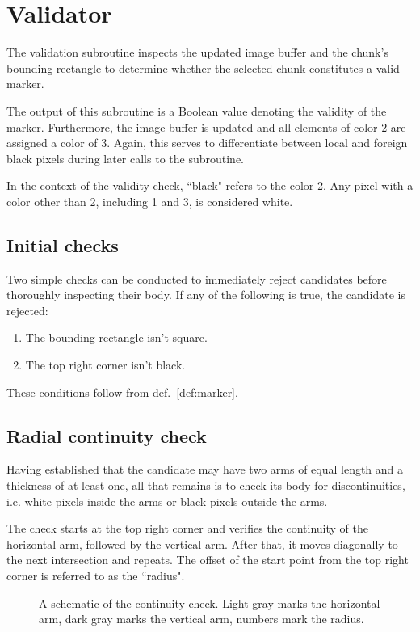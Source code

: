 \documentclass{article}
\begin{document}
	\newpage
	\section{Validator}
	
	The validation subroutine inspects the updated image buffer and the chunk's
	bounding rectangle to determine whether the selected chunk constitutes a
	valid marker.
	
	The output of this subroutine is a Boolean value denoting the validity of
	the marker. Furthermore, the image buffer is updated and all elements of
	color 2 are assigned a color of 3. Again, this serves to differentiate
	between local and foreign black pixels during later calls to the subroutine.
	
	In the context of the validity check, ``black" refers to the color 2.
	Any pixel with a color other than 2, including 1 and 3, is considered white.
	
	\subsection{Initial checks}
	
	Two simple checks can be conducted to immediately reject candidates before
	thoroughly inspecting their body. If any of the following is true, the
	candidate is rejected:
	\begin{enumerate}
		\item The bounding rectangle isn't square.
		\item The top right corner isn't black.
	\end{enumerate}
	These conditions follow from def.~\ref{def:marker}.
	
	\subsection{Radial continuity check}
	
	Having established that the candidate may have two arms of equal length and
	a thickness of at least one, all that remains is to check its body for
	discontinuities, i.e. white pixels inside the arms or black pixels outside
	the arms.
	
	The check starts at the top right corner and verifies the continuity of the
	horizontal arm, followed by the vertical arm. After that, it moves
	diagonally to the next intersection and repeats. The offset of the start
	point from the top right corner is referred to as the ``radius".
	
	\newpage
	\begin{figure}[h]
		\centering
		\caption{A schematic of the continuity check. Light gray marks the
		horizontal arm, dark gray marks the vertical arm, numbers mark the
		radius.}
	\end{figure}
	
\end{document}
